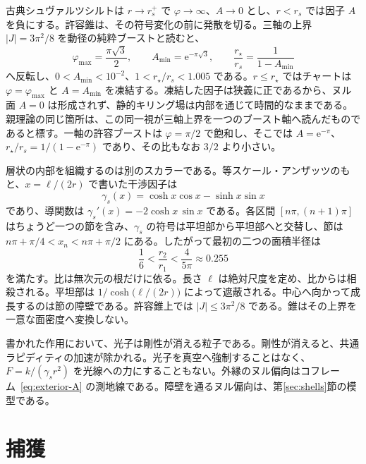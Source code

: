 \documentclass[a4paper]{article}
\begin{document}
古典シュヴァルツシルトは \(r\to r_s^+\) で \(\varphi\to\infty\)、\(A\to 0\) とし、\(r<r_s\) では因子 \(A\) を負にする。許容錐は、その符号変化の前に発散を切る。三軸の上界 \(|J|=3\pi^2/8\) を動径の純粋ブーストと読むと、
\begin{equation}
\label{eq:quasihorizon}
\varphi_{\max}=\frac{\pi\sqrt{3}}{2},
\qquad
A_{\min}=\mathrm{e}^{-\pi\sqrt{3}},
\qquad
\frac{r_\star}{r_s}=\frac{1}{1-A_{\min}}
\end{equation}
へ反転し、\(0<A_{\min}<10^{-2}\)、\(1<r_\star/r_s<1.005\) である。\(r\le r_\star\) ではチャートは \(\varphi=\varphi_{\max}\) と \(A=A_{\min}\) を凍結する。凍結した因子は狭義に正であるから、ヌル面 \(A=0\) は形成されず、静的キリング場は内部を通じて時間的なままである。親理論の同じ箇所は、この同一視が三軸上界を一つのブースト軸へ読んだものであると標す。一軸の許容ブーストは \(\varphi=\pi/2\) で飽和し、そこでは \(A=\mathrm{e}^{-\pi}\)、\(r_\star/r_s=1/(1-\mathrm{e}^{-\pi})\) であり、その比もなお \(3/2\) より小さい。

層状の内部を組織するのは別のスカラーである。等スケール・アンザッツのもと、\(x=\ell/(2r)\) で書いた干渉因子は
\begin{equation}
\label{eq:gamma-s}
\gamma_s(x)=\cosh x\cos x-\sinh x\sin x
\end{equation}
であり、導関数は \(\gamma_s'(x)=-2\cosh x\,\sin x\) である。各区間 \([n\pi,(n+1)\pi]\) はちょうど一つの節を含み、\(\gamma_s\) の符号は平坦部から平坦部へと交替し、節は \(n\pi+\pi/4<x_n<n\pi+\pi/2\) にある。したがって最初の二つの面積半径は
\begin{equation}
\label{eq:radius-ratio}
\frac16<\frac{r_2}{r_1}<\frac{4}{5\pi}\approx 0.255
\end{equation}
を満たす。比は無次元の根だけに依る。長さ \(\ell\) は絶対尺度を定め、比からは相殺される。平坦部は \(1/\cosh\bigl(\ell/(2r)\bigr)\) によって遮蔽される。中心へ向かって成長するのは節の障壁である。許容錐上では \(|J|\le 3\pi^2/8\) である。錐はその上界を一意な面密度へ変換しない。

書かれた作用において、光子は剛性が消える粒子である。剛性が消えると、共通ラピディティの加速が除かれる。光子を真空へ強制することはなく、\(F=k/(\gamma_s r^2)\) を光線への力にすることもない。外縁のヌル偏向はコフレーム~\eqref{eq:exterior-A} の測地線である。障壁を通るヌル偏向は、第\ref{sec:shells}節の模型である。

\section{捕獲}
\label{sec:capture}
\end{document}
